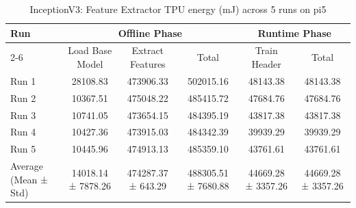 \begin{table}[t]
\centering
\caption{InceptionV3: Feature Extractor TPU energy (mJ) across 5 runs on pi5}
\label{tab:energy_inceptionv3_EdgeTPU_pi5}
\begin{tabular}{lccccc}
\hline
\multirow{2}{*}{Run} & \multicolumn{3}{c}{Offline Phase} & \multicolumn{2}{c}{Runtime Phase} \\
\cline{2-6}
 & Load Base Model & Extract Features & Total & Train Header & Total \\
\hline
  Run 1                  & 28108.83       & 473906.33      & 502015.16      & 48143.38       & 48143.38       \\
  Run 2                  & 10367.51       & 475048.22      & 485415.72      & 47684.76       & 47684.76       \\
  Run 3                  & 10741.05       & 473654.15      & 484395.19      & 43817.38       & 43817.38       \\
  Run 4                  & 10427.36       & 473915.03      & 484342.39      & 39939.29       & 39939.29       \\
  Run 5                  & 10445.96       & 474913.13      & 485359.10      & 43761.61       & 43761.61       \\
\hline
  Average (Mean ± Std)   & 14018.14 ± 7878.26 & 474287.37 ± 643.29 & 488305.51 ± 7680.88 & 44669.28 ± 3357.26 & 44669.28 ± 3357.26 \\
\hline
\end{tabular}
\end{table}
